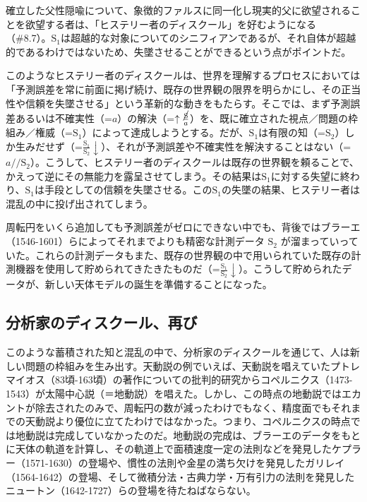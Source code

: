 確立した父性隠喩について、象徴的ファルスに同一化し現実的父に欲望されることを欲望する者は、「ヒステリー者のディスクール」を好むようになる（\#8.7）。\(\textrm{S}_1\)は超越的な対象についてのシニフィアンであるが、それ自体が超越的であるわけではないため、失墜させることができるという点がポイントだ。

このようなヒステリー者のディスクールは、世界を理解するプロセスにおいては「予測誤差を常に前面に掲げ続け、既存の世界観の限界を明らかにし、その正当性や信頼を失墜させる」という革新的な動きをもたらす。そこでは、まず予測誤差あるいは不確実性（=\(a\)）の解決（=\(\uparrow\frac{\cancel{\textrm{S}}}{a}\)）を、既に確立された視点／問題の枠組み／権威（=\(\textrm{S}_1\)）によって達成しようとする。だが、\(\textrm{S}_1\)は有限の知（=\(\textrm{S}_2\)）しか生みだせず（=\(\frac{\textrm{S}_1}{\textrm{S}_2}\downarrow\)）、それが予測誤差や不確実性を解決することはない（=\(a//\textrm{S}_2\)）。こうして、ヒステリー者のディスクールは既存の世界観を頼ることで、かえって逆にその無能力を露呈させてしまう。その結果は\(\textrm{S}_1\)に対する失望に終わり、\(\textrm{S}_1\)は手段としての信頼を失墜させる。この\(\textrm{S}_1\)の失墜の結果、ヒステリー者は混乱の中に投げ出されてしまう。

周転円をいくら追加しても予測誤差がゼロにできない中でも、背後ではブラーエ（1546-1601）らによってそれまでよりも精密な計測データ
\(\textrm{S}_2\)
が溜まっていっていた。これらの計測データもまた、既存の世界観の中で用いられていた既存の計測機器を使用して貯められてきたきたものだ（=\(\frac{\textrm{S}_1}{\textrm{S}_2}\downarrow\)）。こうして貯められたデータが、新しい天体モデルの誕生を準備することになった。

\subsection{分析家のディスクール、再び}\label{ux5206ux6790ux5bb6ux306eux30c7ux30a3ux30b9ux30afux30fcux30ebux518dux3073}

このような蓄積された知と混乱の中で、分析家のディスクールを通じて、人は新しい問題の枠組みを生み出す。天動説の例でいえば、天動説を唱えていたプトレマイオス（83頃-163頃）の著作についての批判的研究からコペルニクス（1473-1543）が太陽中心説（＝地動説）を唱えた。しかし、この時点の地動説ではエカントが除去されたのみで、周転円の数が減ったわけでもなく、精度面でもそれまでの天動説より優位に立てたわけではなかった。つまり、コペルニクスの時点では地動説は完成していなかったのだ。地動説の完成は、ブラーエのデータをもとに天体の軌道を計算し、その軌道上で面積速度一定の法則などを発見したケプラー（1571-1630）の登場や、慣性の法則や金星の満ち欠けを発見したガリレイ（1564-1642）の登場、そして微積分法・古典力学・万有引力の法則を発見したニュートン（1642-1727）らの登場を待たねばならない。

